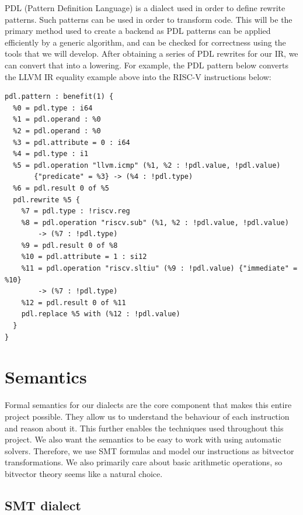 PDL (Pattern Definition Language) is a dialect used in order to define rewrite
patterns. Such patterns can be used in order to transform code.
%
This will be the primary method used to create a backend as PDL patterns can be applied efficiently
by a generic algorithm, and can be checked for correctness using the tools that we will develop. 
After obtaining a series of PDL rewrites for our IR, we can convert that into a lowering.
%
For example, the PDL pattern below converts the LLVM IR equality example above into the RISC-V 
instructions below:
\begin{verbatim}
pdl.pattern : benefit(1) {
  %0 = pdl.type : i64
  %1 = pdl.operand : %0
  %2 = pdl.operand : %0
  %3 = pdl.attribute = 0 : i64
  %4 = pdl.type : i1
  %5 = pdl.operation "llvm.icmp" (%1, %2 : !pdl.value, !pdl.value)
       {"predicate" = %3} -> (%4 : !pdl.type)
  %6 = pdl.result 0 of %5
  pdl.rewrite %5 {
    %7 = pdl.type : !riscv.reg
    %8 = pdl.operation "riscv.sub" (%1, %2 : !pdl.value, !pdl.value) 
        -> (%7 : !pdl.type)
    %9 = pdl.result 0 of %8
    %10 = pdl.attribute = 1 : si12
    %11 = pdl.operation "riscv.sltiu" (%9 : !pdl.value) {"immediate" = %10} 
        -> (%7 : !pdl.type)
    %12 = pdl.result 0 of %11
    pdl.replace %5 with (%12 : !pdl.value)
  }
}
\end{verbatim}

\section{Semantics}

Formal semantics for our dialects are the core component that makes this entire project possible.
They allow us to understand the behaviour of each instruction and reason about it. This further
enables the techniques used throughout this project. We also want the semantics
to be easy to work with using automatic solvers. Therefore, we use SMT formulas and model
our instructions as bitvector transformations. We also primarily care about basic arithmetic
operations, so bitvector theory seems like a natural choice.

\subsection{SMT dialect}

